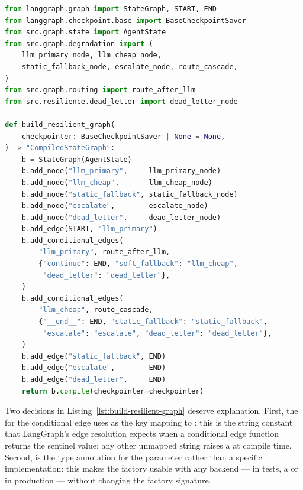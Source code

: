 \begin{lstlisting}[language=Python,
  caption={build\_resilient\_graph factory ---
    \texttt{src/graph/agent.py}},
  label={lst:build-resilient-graph}]
from langgraph.graph import StateGraph, START, END
from langgraph.checkpoint.base import BaseCheckpointSaver
from src.graph.state import AgentState
from src.graph.degradation import (
    llm_primary_node, llm_cheap_node,
    static_fallback_node, escalate_node, route_cascade,
)
from src.graph.routing import route_after_llm
from src.resilience.dead_letter import dead_letter_node

def build_resilient_graph(
    checkpointer: BaseCheckpointSaver | None = None,
) -> "CompiledStateGraph":
    b = StateGraph(AgentState)
    b.add_node("llm_primary",     llm_primary_node)
    b.add_node("llm_cheap",       llm_cheap_node)
    b.add_node("static_fallback", static_fallback_node)
    b.add_node("escalate",        escalate_node)
    b.add_node("dead_letter",     dead_letter_node)
    b.add_edge(START, "llm_primary")
    b.add_conditional_edges(
        "llm_primary", route_after_llm,
        {"continue": END, "soft_fallback": "llm_cheap",
         "dead_letter": "dead_letter"},
    )
    b.add_conditional_edges(
        "llm_cheap", route_cascade,
        {"__end__": END, "static_fallback": "static_fallback",
         "escalate": "escalate", "dead_letter": "dead_letter"},
    )
    b.add_edge("static_fallback", END)
    b.add_edge("escalate",        END)
    b.add_edge("dead_letter",     END)
    return b.compile(checkpointer=checkpointer)
\end{lstlisting}

Two decisions in Listing~\ref{lst:build-resilient-graph} deserve
explanation. First, the  for the 
conditional edge uses  as the key mapping to :
this is the string constant that LangGraph's edge resolution expects when
a conditional edge function returns the  sentinel value; any
other unmapped string raises a  at compile time.
Second,  is the type annotation for the
 parameter rather than a specific implementation: this
makes the factory usable with any backend ---
 in tests, a  or
 in production --- without changing the factory
signature.

